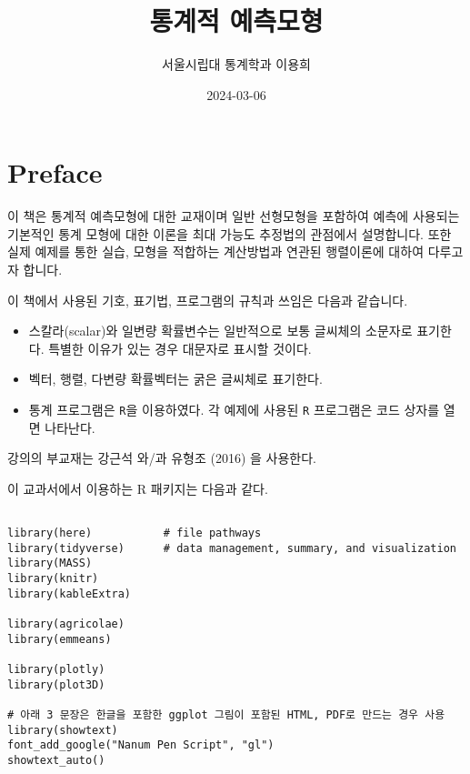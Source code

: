 \documentclass[
  11pt,
  a4paper,
  oneside]{scrbook}
\title{통계적 예측모형}
\author{서울시립대 통계학과 이용희}
\date{2024-03-06}
\providecommand{\tightlist}{%
  \setlength{\itemsep}{0pt}\setlength{\parskip}{0pt}}\usepackage{longtable,booktabs,array}
\renewcommand*\contentsname{목차}
\newcommand\contentsname{목차}
\theoremstyle{definition}
\theoremstyle{plain}
\theoremstyle{definition}
\theoremstyle{definition}
\theoremstyle{remark}
\begin{document}
\frontmatter
\maketitle

\renewcommand*\contentsname{목차}
{
\setcounter{tocdepth}{2}
\tableofcontents
}
\mainmatter
{}

\chapter*{Preface}\label{preface}


이 책은 통계적 예측모형에 대한 교재이며 일반 선형모형을 포함하여 예측에
사용되는 기본적인 통계 모형에 대한 이론을 최대 가능도 추정법의 관점에서
설명합니다. 또한 실제 예제를 통한 실습, 모형을 적합하는 계산방법과
연관된 행렬이론에 대하여 다루고자 합니다.

\begin{tcolorbox}[enhanced jigsaw, colback=white, title=\textcolor{quarto-callout-note-color}{\faInfo}\hspace{0.5em}{노트}, colbacktitle=quarto-callout-note-color!10!white, toprule=.15mm, breakable, bottomtitle=1mm, left=2mm, colframe=quarto-callout-note-color-frame, leftrule=.75mm, coltitle=black, toptitle=1mm, titlerule=0mm, arc=.35mm, opacityback=0, opacitybacktitle=0.6, rightrule=.15mm, bottomrule=.15mm]

이 책에서 사용된 기호, 표기법, 프로그램의 규칙과 쓰임은 다음과 같습니다.

\begin{itemize}
\tightlist
\item
  스칼라(scalar)와 일변량 확률변수는 일반적으로 보통 글씨체의 소문자로
  표기한다. 특별한 이유가 있는 경우 대문자로 표시할 것이다.
\item
  벡터, 행렬, 다변량 확률벡터는 굵은 글씨체로 표기한다.
\item
  통계 프로그램은 \texttt{R}을 이용하였다. 각 예제에 사용된 \texttt{R}
  프로그램은 코드 상자를 열면 나타난다.
\end{itemize}

\end{tcolorbox}

강의의 부교재는 강근석 와/과 유형조 (2016) 을 사용한다.

이 교과서에서 이용하는 R 패키지는 다음과 같다.

\begin{verbatim}

library(here)           # file pathways
library(tidyverse)      # data management, summary, and visualization
library(MASS)
library(knitr)
library(kableExtra)

library(agricolae)
library(emmeans)

library(plotly)
library(plot3D)

# 아래 3 문장은 한글을 포함한 ggplot 그림이 포함된 HTML, PDF로 만드는 경우 사용
library(showtext)
font_add_google("Nanum Pen Script", "gl")
showtext_auto()
\end{verbatim}
\end{document}
